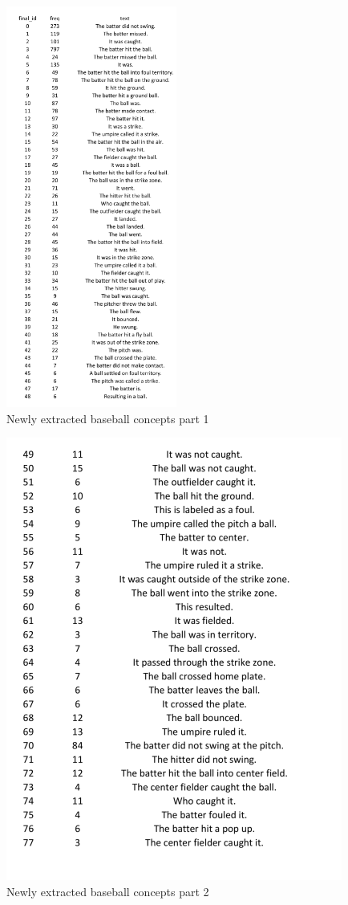 \begin{figure}[h]
\centering
\caption{Newly extracted baseball concepts part 1}
\includegraphics[width=0.5\textwidth]{appendix/baseball_new2.png}
\end{figure}
\begin{figure}[h]
\caption{Newly extracted baseball concepts part 2}
\centering
\includegraphics[width=\textwidth]{appendix/baseball_new1.png}
\end{figure}

